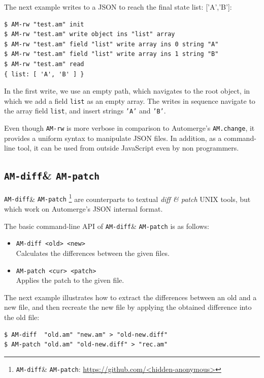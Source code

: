 \documentclass[12pt]{article}
\newcommand{\code}[1]  {\texttt{\footnotesize{#1}}}
\newcommand{\amrw}       {\code{AM-rw}\xspace}
\newcommand{\amdiff}     {\code{AM-diff}\xspace}
\newcommand{\ampatch}    {\code{AM-patch}\xspace}
\begin{document}
The next example writes to a JSON to reach the final state {list: ['A','B']}:

{\footnotesize
\begin{verbatim}
$ AM-rw "test.am" init
$ AM-rw "test.am" write object ins "list" array
$ AM-rw "test.am" field "list" write array ins 0 string "A"
$ AM-rw "test.am" field "list" write array ins 1 string "B"
$ AM-rw "test.am" read
{ list: [ 'A', 'B' ] }
\end{verbatim}
}

In the first write, we use an empty path, which navigates to the root object,
in which we add a field \code{list} as an empty array.
The writes in sequence navigate to the array field \code{list}, and insert
strings \code{'A'} and \code{'B'}.

Even though \amrw is more verbose in comparison to Automerge's
\code{AM.change}, it provides a uniform syntax to manipulate JSON files.
In addition, as a command-line tool, it can be used from outside JavaScript
even by non programmers.

\subsection{\amdiff \& \ampatch}

\amdiff \& \ampatch%
    \footnote{\amdiff \& \ampatch: \url{https://github.com/<hidden-anonymous>}}
are counterparts to textual \emph{diff \& patch} UNIX tools, but which work on
Automerge's JSON internal format.

The basic command-line API of \amdiff \& \ampatch is as follows:

\begin{itemize}
\item \code{AM-diff <old> <new>} \\
    Calculates the differences between the given files.
\item \code{AM-patch <cur> <patch>} \\
    Applies the patch to the given file.
\end{itemize}

The next example illustrates how to extract the differences between an old and
a new file, and then recreate the new file by applying the obtained difference
into the old file:

{\footnotesize
\begin{verbatim}
$ AM-diff  "old.am" "new.am" > "old-new.diff"
$ AM-patch "old.am" "old-new.diff" > "rec.am"
\end{verbatim}
}
\end{document}
